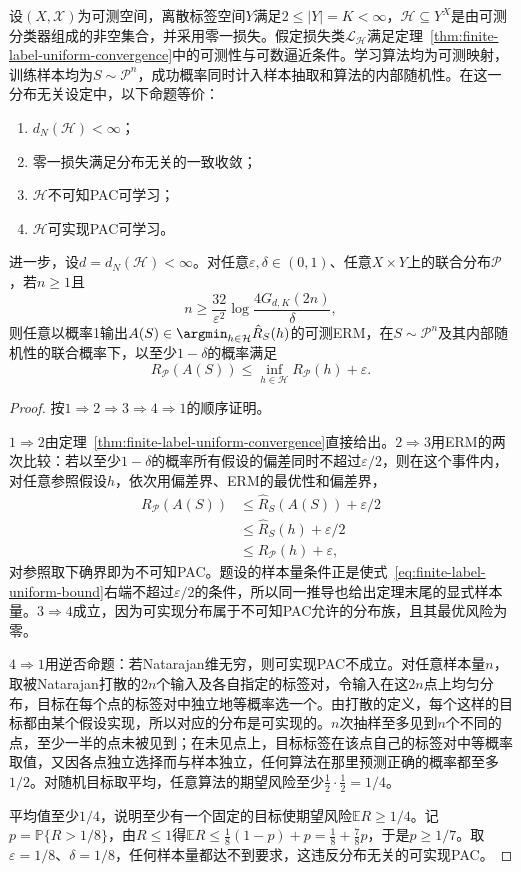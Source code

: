\begin{theorem}[有限标签的可学习性刻画]
\label{thm:finite-label-learnability}
设$(X,\mathcal X)$为可测空间，离散标签空间$Y$满足$2\leq|Y|=K<\infty$，$\mathcal H\subseteq Y^X$是由可测分类器组成的非空集合，并采用零一损失。假定损失类$\mathcal L_{\mathcal H}$满足定理~\ref{thm:finite-label-uniform-convergence}中的可测性与可数逼近条件。学习算法均为可测映射，训练样本均为$S\sim\mathcal P^n$，成功概率同时计入样本抽取和算法的内部随机性。在这一分布无关设定中，以下命题等价：
\begin{enumerate}
 \item $d_N(\mathcal H)<\infty$；
 \item 零一损失满足分布无关的一致收敛；
 \item $\mathcal H$不可知PAC可学习；
 \item $\mathcal H$可实现PAC可学习。
\end{enumerate}
进一步，设$d=d_N(\mathcal H)<\infty$。对任意$\varepsilon,\delta\in(0,1)$、任意$X\times Y$上的联合分布$\mathcal P$，若$n\geq1$且
\[
 n\geq\frac{32}{\varepsilon^2}\log\frac{4G_{d,K}(2n)}{\delta},
\]
则任意以概率1输出$A(S)\in\argmin_{h\in\mathcal H}\hat R_S(h)$的可测ERM，在$S\sim\mathcal P^n$及其内部随机性的联合概率下，以至少$1-\delta$的概率满足
\[
 R_{\mathcal P}(A(S))\leq\inf_{h\in\mathcal H}R_{\mathcal P}(h)+\varepsilon.
\]
\end{theorem}

\begin{proof}
按$1\Rightarrow2\Rightarrow3\Rightarrow4\Rightarrow1$的顺序证明。

$1\Rightarrow2$由定理~\ref{thm:finite-label-uniform-convergence}直接给出。$2\Rightarrow3$用ERM的两次比较：若以至少$1-\delta$的概率所有假设的偏差同时不超过$\varepsilon/2$，则在这个事件内，对任意参照假设$h$，依次用偏差界、ERM的最优性和偏差界，
\begin{align*}
 R_{\mathcal P}(A(S))&\leq\hat R_S(A(S))+\varepsilon/2\\
 &\leq\hat R_S(h)+\varepsilon/2\\
 &\leq R_{\mathcal P}(h)+\varepsilon,
\end{align*}
对参照取下确界即为不可知PAC。题设的样本量条件正是使式~\eqref{eq:finite-label-uniform-bound}右端不超过$\varepsilon/2$的条件，所以同一推导也给出定理末尾的显式样本量。$3\Rightarrow4$成立，因为可实现分布属于不可知PAC允许的分布族，且其最优风险为零。

$4\Rightarrow1$用逆否命题：若Natarajan维无穷，则可实现PAC不成立。对任意样本量$n$，取被Natarajan打散的$2n$个输入及各自指定的标签对，令输入在这$2n$点上均匀分布，目标在每个点的标签对中独立地等概率选一个。由打散的定义，每个这样的目标都由某个假设实现，所以对应的分布是可实现的。$n$次抽样至多见到$n$个不同的点，至少一半的点未被见到；在未见点上，目标标签在该点自己的标签对中等概率取值，又因各点独立选择而与样本独立，任何算法在那里预测正确的概率都至多$1/2$。对随机目标取平均，任意算法的期望风险至少$\frac12\cdot\frac12=1/4$。

平均值至少$1/4$，说明至少有一个固定的目标使期望风险$\mathbb ER\geq1/4$。记$p=\mathbb P\{R>1/8\}$，由$R\leq1$得$\mathbb ER\leq\frac18(1-p)+p=\frac18+\frac78p$，于是$p\geq1/7$。取$\varepsilon=1/8$、$\delta=1/8$，任何样本量都达不到要求，这违反分布无关的可实现PAC。
\end{proof}

